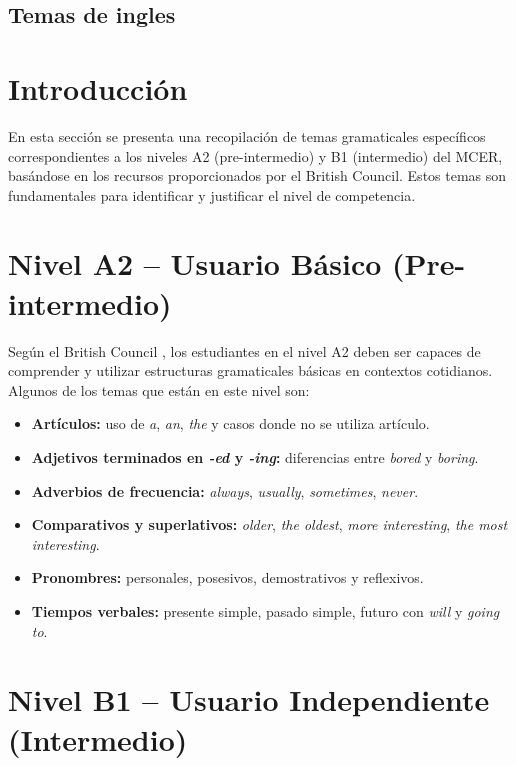 \subsection{Temas de ingles}

\section*{Introducción}

En esta sección se presenta una recopilación de temas gramaticales específicos correspondientes a los niveles A2 (pre-intermedio) \cite{britisha1a2grammar} y B1 (intermedio) \cite{britishb1b2grammar} del MCER, basándose en los recursos proporcionados por el British Council. Estos temas son fundamentales para identificar y justificar el nivel de competencia.

\section*{Nivel A2 – Usuario Básico (Pre-intermedio)}

Según el British Council \cite{britisha1a2grammar}, los estudiantes en el nivel A2 deben ser capaces de comprender y utilizar estructuras gramaticales básicas en contextos cotidianos. Algunos de los temas que están en este nivel son:

\begin{itemize}[leftmargin=*, label=--]
    \item \textbf{Artículos:} uso de \textit{a}, \textit{an}, \textit{the} y casos donde no se utiliza artículo.
    \item \textbf{Adjetivos terminados en \textit{-ed} y \textit{-ing}:} diferencias entre \textit{bored} y \textit{boring}.
    \item \textbf{Adverbios de frecuencia:} \textit{always}, \textit{usually}, \textit{sometimes}, \textit{never}.
    \item \textbf{Comparativos y superlativos:} \textit{older}, \textit{the oldest}, \textit{more interesting}, \textit{the most interesting}.
    \item \textbf{Pronombres:} personales, posesivos, demostrativos y reflexivos.
    \item \textbf{Tiempos verbales:} presente simple, pasado simple, futuro con \textit{will} y \textit{going to}.
\end{itemize}

\section*{Nivel B1 – Usuario Independiente (Intermedio)}

